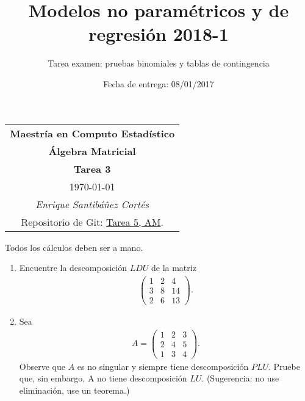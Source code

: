 \documentclass[11pt,letterpaper]{article}
\title{Modelos no paramétricos y de regresión 2018-1}
\author{Tarea examen: pruebas binomiales y tablas de contingencia}
\date{Fecha de entrega: 08/01/2017}
\begin{document}
\begin{table}[ht]
\centering
\begin{tabular}{c}
\textbf{Maestría en Computo Estadístico}\\
\textbf{Álgebra Matricial} \\
\textbf{Tarea 3}\\
\today \\
\emph{Enrique Santibáñez Cortés}\\
Repositorio de Git: \href{https://github.com/Enriquesec/Algebra_matricial/tree/master/tareas/Tarea_5}{Tarea 5, AM}.
\end{tabular}
\end{table}
Todos los cálculos deben ser a mano.
\begin{enumerate}

\item Encuentre la descomposición $LDU$ de la matriz
\begin{align*}
\begin{pmatrix}
1 & 2 & 4\\
3 & 8 & 14\\
2 & 6 & 13
\end{pmatrix}.
\end{align*}

\item Sea 
\begin{align*}
A=\begin{pmatrix}
1 & 2 & 3\\
2 & 4 & 5\\
1 & 3 & 4
\end{pmatrix}.
\end{align*}
Observe que $A$ es no singular y siempre tiene descomposición $PLU$. Pruebe que, sin embargo, A no tiene descomposición $LU$. (Sugerencia: no use eliminación, use un teorema.)


\end{enumerate}
\end{document}
